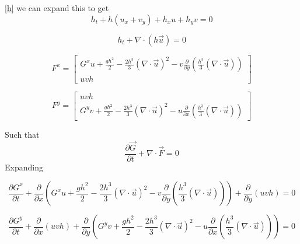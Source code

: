 \documentclass[12pt]{article}
\begin{document}
\eqref{h} we can expand this to get
\[h_t + h(u_x + v_y) + h_xu + h_yv = 0\]

\[h_t + \nabla \cdot (h\vec{u}) = 0\]

\begin{equation}
\label{Fx}
F^x = \left[ \begin{array}{c}
G^xu + \frac{gh^2}{2} - \frac{2h^3}{3}\left(\nabla \cdot \vec{u}\right)^2 - v\frac{\partial}{\partial y}\left( \frac{h^3}{3} \left(\nabla \cdot \vec{u}\right)\right) \\
uvh
\end{array} \right] 
\end{equation}

\begin{equation}
\label{Fy}
F^y = \left[ \begin{array}{c}
uvh \\
G^yv + \frac{gh^2}{2} - \frac{2h^3}{3}\left(\nabla \cdot \vec{u}\right)^2 - u\frac{\partial}{\partial x}\left( \frac{h^3}{3} \left(\nabla \cdot \vec{u}\right)\right)
\end{array} \right] 
\end{equation}

Such that
\[\frac{\partial \vec{G}}{\partial t} + \nabla \cdot \vec{F} = 0\]
Expanding

\[\frac{\partial G^x}{\partial t} + \frac{\partial }{\partial x} \left(G^xu + \frac{gh^2}{2} - \frac{2h^3}{3}\left(\nabla \cdot \vec{u}\right)^2 - v\frac{\partial}{\partial y}\left( \frac{h^3}{3} \left(\nabla \cdot \vec{u}\right)\right) \right) + \frac{\partial }{\partial y}\left(uvh\right)= 0\]

\[\frac{\partial G^y}{\partial t} + \frac{\partial }{\partial x} \left(uvh \right) + \frac{\partial }{\partial y}\left(G^yv + \frac{gh^2}{2} - \frac{2h^3}{3}\left(\nabla \cdot \vec{u}\right)^2 - u\frac{\partial}{\partial x}\left( \frac{h^3}{3} \left(\nabla \cdot \vec{u}\right)\right)\right)= 0\]
\end{document}
